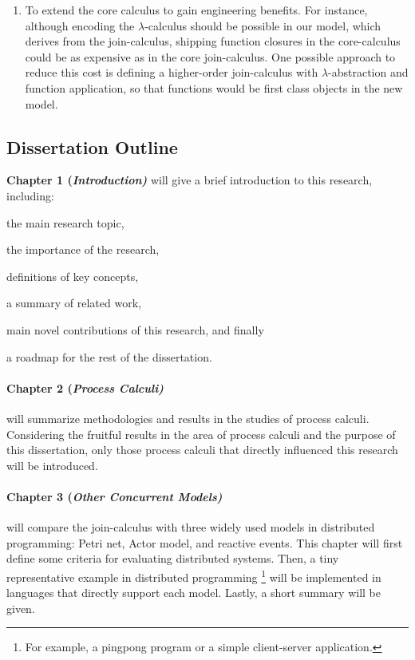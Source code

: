 \begin{enumerate}
  \item To extend the core calculus to gain engineering benefits.  For instance, although encoding the $\lambda$-calculus should be possible in our model, which derives from the join-calculus, shipping function closures in the core-calculus could be as expensive as in the core join-calculus.  One possible approach to reduce this cost is defining a higher-order join-calculus with $\lambda$-abstraction and function application, so that functions would be first class objects in the new model.
\end{enumerate}


\subsection{Dissertation Outline}
\label{DToutline}
{\bf{Chapter 1} (\it{Introduction})} will give a brief introduction to this research, including: 
\begin{inparaenum} [(1)]
  \item the main research topic,
  \item the importance of the research,
  \item definitions of key concepts,
  \item a summary of related work,
  \item main novel contributions of this research, and finally
  \item a roadmap for the rest of the dissertation.
\end{inparaenum}

\paragraph{Chapter 2 (\it{Process Calculi})} will summarize methodologies and results in the studies of process calculi.  Considering the fruitful results in the area of process calculi and the purpose of this dissertation, only those process calculi that directly influenced this research will be introduced.

\paragraph{Chapter 3 (\it{Other Concurrent Models})} will compare the join-calculus with three widely used models in distributed programming:  Petri net, Actor model, and reactive events.  This chapter will first define some criteria for evaluating distributed systems.  Then, a tiny representative example in distributed programming \footnote{For example, a pingpong program or a simple client-server application.} will be implemented in languages that directly support each model.  Lastly, a short summary will be given.


